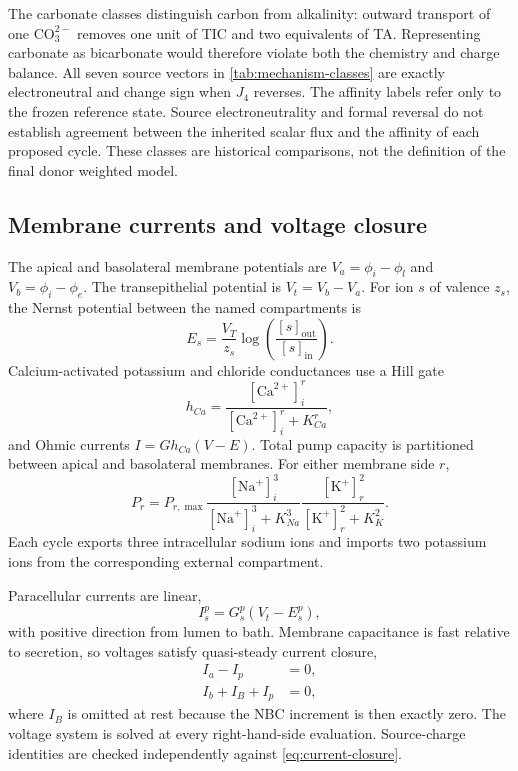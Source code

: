 \documentclass[11pt]{article}
\newcommand{\Na}{\mathrm{Na}^{+}}
\newcommand{\K}{\mathrm{K}^{+}}
\newcommand{\COthree}{\mathrm{CO}_{3}^{2-}}
\newcommand{\Ca}{\mathrm{Ca}^{2+}}
\begin{document}
The carbonate classes distinguish carbon from alkalinity: outward transport of one $\COthree$ removes one unit of TIC and two equivalents of TA. Representing carbonate as bicarbonate would therefore violate both the chemistry and charge balance. All seven source vectors in \cref{tab:mechanism-classes} are exactly electroneutral and change sign when $J_4$ reverses. The affinity labels refer only to the frozen reference state. Source electroneutrality and formal reversal do not establish agreement between the inherited scalar flux and the affinity of each proposed cycle. These classes are historical comparisons, not the definition of the final donor weighted model.

\subsection{Membrane currents and voltage closure}

The apical and basolateral membrane potentials are $V_a=\phi_i-\phi_l$ and $V_b=\phi_i-\phi_e$. The transepithelial potential is $V_t=V_b-V_a$. For ion $s$ of valence $z_s$, the Nernst potential between the named compartments is
\begin{equation*}
    E_s=\frac{V_T}{z_s}\log\!\left(\frac{[s]_{\mathrm{out}}}{[s]_{\mathrm{in}}}\right).
\end{equation*}
Calcium-activated potassium and chloride conductances use a Hill gate
\begin{equation*}
    h_{Ca}=\frac{[\Ca]_i^r}{[\Ca]_i^r+K_{Ca}^r},
\end{equation*}
and Ohmic currents $I=Gh_{Ca}(V-E)$. Total pump capacity is partitioned between apical and basolateral membranes. For either membrane side $r$,
\begin{equation*}
    P_r=P_{r,\max}
    \frac{[\Na]_i^3}{[\Na]_i^3+K_{Na}^3}
    \frac{[\K]_r^2}{[\K]_r^2+K_K^2}.
\end{equation*}
Each cycle exports three intracellular sodium ions and imports two potassium ions from the corresponding external compartment.

Paracellular currents are linear,
\begin{equation*}
    I_s^p=G_s^p(V_t-E_s^p),
\end{equation*}
with positive direction from lumen to bath. Membrane capacitance is fast relative to secretion, so voltages satisfy quasi-steady current closure,
\begin{equation}
\begin{aligned}
    I_a-I_p&=0,\\
    I_b+I_B+I_p&=0,
\end{aligned}
\label{eq:current-closure}
\end{equation}
where $I_B$ is omitted at rest because the NBC increment is then exactly zero. The voltage system is solved at every right-hand-side evaluation. Source-charge identities are checked independently against \cref{eq:current-closure}.
\end{document}
